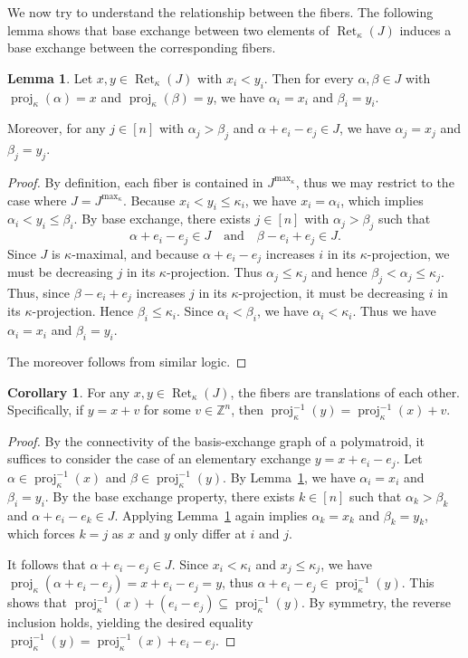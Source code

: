 \documentclass[11pt]{article}
\theoremstyle{definition}
\newtheorem{lemma}[theorem]{Lemma}
\newtheorem{corollary}[theorem]{Corollary}
\theoremstyle{remark}
\DeclareMathOperator{\proj}{proj}              %
\newcommand{\kproj}{\proj_{\kappa}}            %
\DeclareMathOperator{\Ret}{Ret}                %
\newcommand{\RetK}{\Ret_{\kappa}}              %
\newcommand{\Jmax}{J^{\max_{\kappa}}}
\begin{document}
We now try to understand the relationship between the fibers. The following lemma shows that base exchange between two elements of $\RetK(J)$ induces a base exchange between the corresponding fibers.
\begin{lemma} \label{lemma:fiber_exchange_like_retraction}
    Let $x,y \in \RetK(J)$ with $x_i < y_i$. Then for every $\alpha,\beta \in J$ with $\kproj(\alpha) = x$ and $\kproj(\beta)= y$, we have $\alpha_i = x_i$ and $\beta_i = y_i$.

    Moreover, for any $j \in [n]$ with $\alpha_j > \beta_j$ and $\alpha+e_i -e_j \in J$, we have $\alpha_j = x_j$ and $\beta_j = y_j$.
\end{lemma}
\begin{proof}
    By definition, each fiber is contained in $\Jmax$, thus we may restrict to the case where $J = \Jmax$. Because $x_i < y_i \leq \kappa_i$, we have $x_i = \alpha_i$, which implies $\alpha_i < y_i \leq \beta_i$. By base exchange, there exists $j \in [n]$ with $\alpha_j > \beta_j$ such that \[
    \alpha + e_i -e_j \in J \quad \text{and} \quad \beta-e_i +e_j \in J.
    \]
    Since $J$ is $\kappa$-maximal, and because $\alpha+e_i -e_j$ increases $i$ in its $\kappa$-projection, we must be decreasing $j$ in its $\kappa$-projection. Thus $\alpha_j \leq \kappa_j$ and hence $\beta_j < \alpha_j \leq \kappa_j$. Thus, since $\beta -e_i +e_j$ increases $j$ in its $\kappa$-projection, it must be decreasing $i$ in its $\kappa$-projection. Hence $\beta_i \leq \kappa_i$. Since $\alpha_i < \beta_i$, we have $\alpha_i < \kappa_i$. Thus we have $\alpha_i = x_i$ and $\beta_i = y_i$.

    The moreover follows from similar logic.
\end{proof}

\begin{corollary} \label{corollary:fibers_are_translations}
    For any $x, y \in \RetK(J)$, the fibers are translations of each other. Specifically, if $y = x + v$ for some $v \in \mathbb{Z}^n$, then $\kproj^{-1}(y) = \kproj^{-1}(x) + v$.
\end{corollary}
\begin{proof}
    By the connectivity of the basis-exchange graph of a polymatroid, it suffices to consider the case of an elementary exchange $y = x + e_i - e_j$. Let $\alpha \in \kproj^{-1}(x)$ and $\beta \in \kproj^{-1}(y)$. By Lemma~\ref{lemma:fiber_exchange_like_retraction}, we have $\alpha_i = x_i$ and $\beta_i = y_i$. By the base exchange property, there exists $k \in [n]$ such that $\alpha_k > \beta_k$ and $\alpha + e_i - e_k \in J$. Applying Lemma~\ref{lemma:fiber_exchange_like_retraction} again implies $\alpha_k = x_k$ and $\beta_k = y_k$, which forces $k = j$ as $x$ and $y$ only differ at $i$ and $j$.

    It follows that $\alpha + e_i - e_j \in J$. Since $x_i < \kappa_i$ and $x_j \leq \kappa_j$, we have $\kproj(\alpha + e_i - e_j) = x + e_i - e_j = y$, thus $\alpha + e_i - e_j \in \kproj^{-1}(y)$. This shows that $\kproj^{-1}(x) + (e_i - e_j) \subseteq \kproj^{-1}(y)$. By symmetry, the reverse inclusion holds, yielding the desired equality $
        \kproj^{-1}(y) = \kproj^{-1}(x) + e_i - e_j.$
\end{proof}
\end{document}
